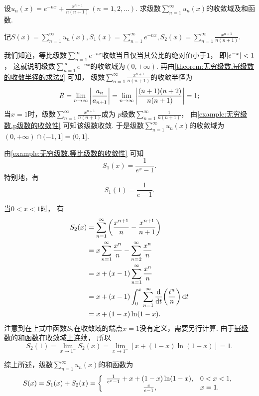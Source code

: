 \begin{example}
设\(u_n(x) = e^{-nx} + \frac{x^{n+1}}{n(n+1)}\ (n=1,2,\dotsc)\).
求级数\(\sum_{n=1}^\infty u_n(x)\)的收敛域及和函数.
\begin{solution}
记\(S(x) = \sum_{n=1}^\infty u_n(x),
S_1(x) = \sum_{n=1}^\infty e^{-nx},
S_2(x) = \sum_{n=1}^\infty \frac{x^{n+1}}{n(n+1)}\).

我们知道，等比级数\(\sum_{n=1}^\infty e^{-nx}\)收敛当且仅当其公比的绝对值小于\(1\)，
即\(\abs{e^{-x}} < 1\)，
这就说明级数\(\sum_{n=1}^\infty e^{-nx}\)的收敛域为\((0,+\infty)\).
再由\cref{theorem:无穷级数.幂级数的收敛半径的求法2} 可知，
级数\(\sum_{n=1}^\infty \frac{x^{n+1}}{n(n+1)}\)的收敛半径为\begin{equation*}
	R = \lim_{n\to\infty} \abs{\frac{a_n}{a_{n+1}}}
	= \lim_{n\to\infty} \abs{\frac{(n+1)(n+2)}{n(n+1)}}
	= 1;
\end{equation*}
当\(x=1\)时，级数\(\sum_{n=1}^\infty \frac{x^{n+1}}{n(n+1)}\)成为
\(p\)级数\(\sum_{n=1}^\infty \frac1{n(n+1)}\)，
由\cref{example:无穷级数.p级数的收敛性} 可知该级数收敛.
于是级数\(\sum_{n=1}^\infty u_n(x)\)的收敛域为
\((0,+\infty) \cap (-1,1] = (0,1]\).

由\cref{example:无穷级数.等比级数的收敛性} 可知\begin{equation*}
	S_1(x) = \frac1{e^x-1}.
\end{equation*}
特别地，有\begin{equation*}
	S_1(1) = \frac1{e-1}.
\end{equation*}

当\(0<x<1\)时，
有\begin{align*}
	S_2(x) &= \sum_{n=1}^\infty \left( \frac{x^{n+1}}{n} - \frac{x^{n+1}}{n+1} \right) \\
	&= x \sum_{n=1}^\infty \frac{x^n}{n} - \sum_{n=2}^\infty \frac{x^n}{n} \\
	&= x + (x-1) \sum_{n=1}^\infty \frac{x^n}{n} \\
	&= x + (x-1) \int_0^x \sum_{n=1}^\infty \dv{t}(\frac{t^n}{n}) \dd{t} \\
	&= x + (1-x) \ln(1-x).
\end{align*}
注意到在上式中函数\(S_2\)在收敛域的端点\(x=1\)没有定义，需要另行计算.
由于\hyperref[theorem:无穷级数.幂级数的和函数的性质1]{幂级数的和函数在收敛域上连续}，
所以\begin{equation*}
	S_2(1) = \lim_{x\to1^-} S_2(x)
	= \lim_{x\to1^-} [x + (1-x) \ln(1-x)]
	= 1.
\end{equation*}

综上所述，级数\(\sum_{n=1}^\infty u_n(x)\)的和函数为\begin{equation*}
	S(x)
	= S_1(x) + S_2(x) \\
	= \left\{ \begin{array}{cl}
		\frac1{e^x-1} + x + (1-x) \ln(1-x),
			& 0<x<1, \\
		\frac{e}{e-1},
			& x=1.
	\end{array} \right.
\end{equation*}
\end{solution}
\end{example}

